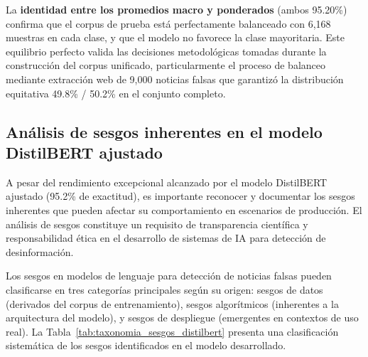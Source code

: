 La \textbf{identidad entre los promedios macro y ponderados} (ambos 95.20\%) confirma que el corpus de prueba está perfectamente balanceado con 6,168 muestras en cada clase, y que el modelo no favorece la clase mayoritaria. Este equilibrio perfecto valida las decisiones metodológicas tomadas durante la construcción del corpus unificado, particularmente el proceso de balanceo mediante extracción web de 9,000 noticias falsas que garantizó la distribución equitativa 49.8\% / 50.2\% en el conjunto completo.

\subsection{Análisis de sesgos inherentes en el modelo DistilBERT ajustado}
\label{subsec:sesgos_modelo_distilbert}

A pesar del rendimiento excepcional alcanzado por el modelo DistilBERT ajustado (95.2\% de exactitud), es importante reconocer y documentar los sesgos inherentes que pueden afectar su comportamiento en escenarios de producción. El análisis de sesgos constituye un requisito de transparencia científica y responsabilidad ética en el desarrollo de sistemas de IA para detección de desinformación.

Los sesgos en modelos de lenguaje para detección de noticias falsas pueden clasificarse en tres categorías principales según su origen: sesgos de datos (derivados del corpus de entrenamiento), sesgos algorítmicos (inherentes a la arquitectura del modelo), y sesgos de despliegue (emergentes en contextos de uso real). La Tabla~\ref{tab:taxonomia_sesgos_distilbert} presenta una clasificación sistemática de los sesgos identificados en el modelo desarrollado.

